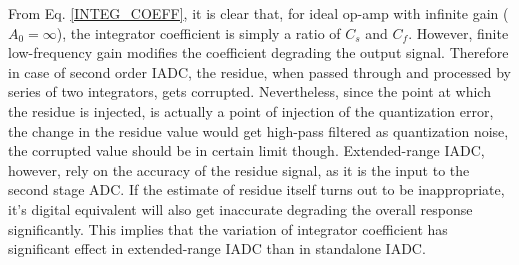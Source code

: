 From Eq. \ref{INTEG_COEFF}, it is clear that, for ideal op-amp with infinite gain ($A_0=\infty$), the integrator coefficient is simply a ratio of $C_s$ and $C_f$. However, finite low-frequency gain modifies the coefficient degrading the output signal. Therefore in case of second order IADC, the residue, when passed through and processed by series of two integrators, gets corrupted. Nevertheless, since the point at which the residue is injected, is actually a point of injection of the quantization error, the change in the residue value would get high-pass filtered as quantization noise, the corrupted value should be in certain limit though. Extended-range IADC, however, rely on the accuracy of the residue signal, as it is the input to the second stage ADC. If the estimate of residue itself turns out to be inappropriate, it's digital equivalent will also get inaccurate degrading the overall response significantly. This implies that the variation of integrator coefficient has significant effect in extended-range IADC than in standalone IADC.
